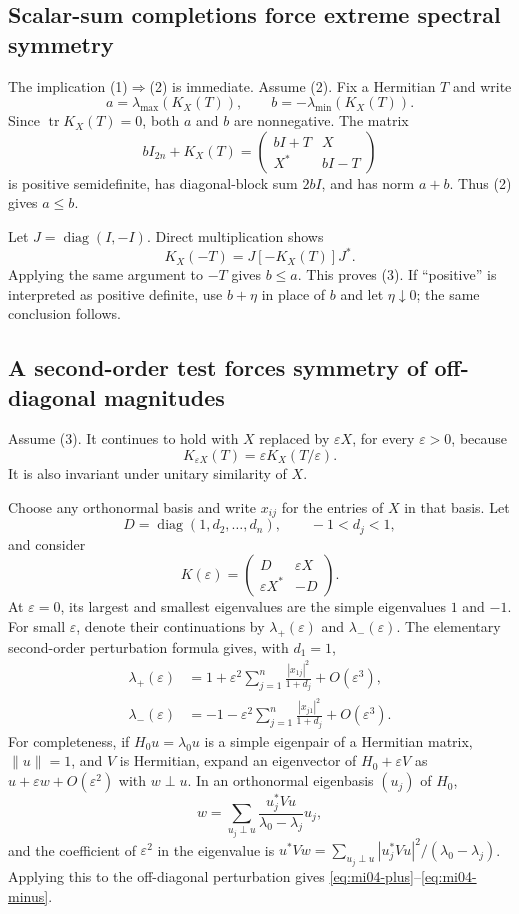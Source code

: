 \documentclass[10pt,a4paper]{article}
\theoremstyle{remark}
\newcommand{\tr}{\operatorname{tr}}
\newcommand{\diag}{\operatorname{diag}}
\begin{document}
\subsection{Scalar-sum completions force extreme spectral symmetry}

The implication (1)$\Rightarrow$(2) is immediate. Assume (2). Fix a Hermitian $T$ and write
\[
 a=\lambda_{\max}(K_X(T)),\qquad b=-\lambda_{\min}(K_X(T)).
\]
Since $\tr K_X(T)=0$, both $a$ and $b$ are nonnegative. The matrix
\[
 bI_{2n}+K_X(T)
 =\begin{pmatrix}bI+T&X\\X^*&bI-T\end{pmatrix}
\]
is positive semidefinite, has diagonal-block sum $2bI$, and has norm $a+b$. Thus (2) gives $a\leq b$.

Let $J=\diag(I,-I)$. Direct multiplication shows
\[
 K_X(-T)=J[-K_X(T)]J^*.
\]
Applying the same argument to $-T$ gives $b\leq a$. This proves (3).
If ``positive'' is interpreted as positive definite, use $b+\eta$ in place of $b$ and let $\eta\downarrow0$; the same conclusion follows.

\subsection{A second-order test forces symmetry of off-diagonal magnitudes}

Assume (3). It continues to hold with $X$ replaced by $\varepsilon X$, for every $\varepsilon>0$, because
\[
 K_{\varepsilon X}(T)=\varepsilon K_X(T/\varepsilon).
\]
It is also invariant under unitary similarity of $X$.

Choose any orthonormal basis and write $x_{ij}$ for the entries of $X$ in that basis. Let
\[
 D=\diag(1,d_2,\ldots,d_n),\qquad -1<d_j<1,
\]
and consider
\[
 K(\varepsilon)=\begin{pmatrix}D&\varepsilon X\\\varepsilon X^*&-D\end{pmatrix}.
\]
At $\varepsilon=0$, its largest and smallest eigenvalues are the simple eigenvalues $1$ and $-1$. For small $\varepsilon$, denote their continuations by $\lambda_+(\varepsilon)$ and $\lambda_-(\varepsilon)$. The elementary second-order perturbation formula gives, with $d_1=1$,
\begin{align}
 \lambda_+(\varepsilon)
 &=1+\varepsilon^2\sum_{j=1}^n\frac{|x_{1j}|^2}{1+d_j}
   +O(\varepsilon^3),\label{eq:mi04-plus}\\
 \lambda_-(\varepsilon)
 &=-1-\varepsilon^2\sum_{j=1}^n\frac{|x_{j1}|^2}{1+d_j}
   +O(\varepsilon^3).\label{eq:mi04-minus}
\end{align}
For completeness, if $H_0u=\lambda_0u$ is a simple eigenpair of a Hermitian matrix, $\|u\|=1$, and $V$ is Hermitian, expand an eigenvector of $H_0+\varepsilon V$ as $u+\varepsilon w+O(\varepsilon^2)$ with $w\perp u$. In an orthonormal eigenbasis $(u_j)$ of $H_0$,
\[
 w=\sum_{u_j\perp u}\frac{u_j^*Vu}{\lambda_0-\lambda_j}u_j,
\]
and the coefficient of $\varepsilon^2$ in the eigenvalue is
$u^*Vw=\sum_{u_j\perp u}|u_j^*Vu|^2/(\lambda_0-\lambda_j)$.
Applying this to the off-diagonal perturbation gives \eqref{eq:mi04-plus}--\eqref{eq:mi04-minus}.
\end{document}
